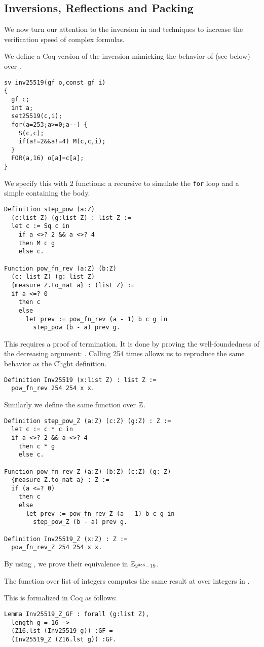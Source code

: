 \subsection{Inversions, Reflections and Packing}

We now turn our attention to the inversion in \Zfield and techniques to
increase the verification speed of complex formulas.

We define a Coq version of the inversion mimicking
the behavior of  (see below) over .
\begin{lstlisting}[language=Ctweetnacl]
sv inv25519(gf o,const gf i)
{
  gf c;
  int a;
  set25519(c,i);
  for(a=253;a>=0;a--) {
    S(c,c);
    if(a!=2&&a!=4) M(c,c,i);
  }
  FOR(a,16) o[a]=c[a];
}
\end{lstlisting}
We specify this with 2 functions: a recursive 
to simulate the \texttt{for} loop and a simple  containing the body.
\begin{lstlisting}[language=Coq]
Definition step_pow (a:Z)
  (c:list Z) (g:list Z) : list Z :=
  let c := Sq c in
    if a <>? 2 && a <>? 4
    then M c g
    else c.

Function pow_fn_rev (a:Z) (b:Z)
  (c: list Z) (g: list Z)
  {measure Z.to_nat a} : (list Z) :=
  if a <=? 0
    then c
    else
      let prev := pow_fn_rev (a - 1) b c g in
        step_pow (b - a) prev g.
\end{lstlisting}
This  requires a proof of termination. It is done by proving the
well-foundedness of the decreasing argument: . Calling
 254 times allows us to reproduce the same behavior as the Clight definition.
\begin{lstlisting}[language=Coq]
Definition Inv25519 (x:list Z) : list Z :=
  pow_fn_rev 254 254 x x.
\end{lstlisting}
Similarly we define the same function over $\mathbb{Z}$.
\begin{lstlisting}[language=Coq]
Definition step_pow_Z (a:Z) (c:Z) (g:Z) : Z :=
  let c := c * c in
  if a <>? 2 && a <>? 4
    then c * g
    else c.

Function pow_fn_rev_Z (a:Z) (b:Z) (c:Z) (g: Z)
  {measure Z.to_nat a} : Z :=
  if (a <=? 0)
    then c
    else
      let prev := pow_fn_rev_Z (a - 1) b c g in
        step_pow_Z (b - a) prev g.

Definition Inv25519_Z (x:Z) : Z :=
  pow_fn_rev_Z 254 254 x x.
\end{lstlisting}
By using , we prove their equivalence in $\mathbb{Z}_{2^{255}-19}$.
\begin{lemma}
\label{lemma:Inv_equivalence}
The function  over list of integers computes the same
result at  over integers in \Zfield.
\end{lemma}
This is formalized in Coq as follows:
\begin{lstlisting}[language=Coq]
Lemma Inv25519_Z_GF : forall (g:list Z),
  length g = 16 ->
  (Z16.lst (Inv25519 g)) :GF =
  (Inv25519_Z (Z16.lst g)) :GF.
\end{lstlisting}

